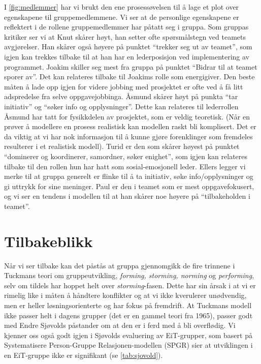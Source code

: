 I \cref{fig:medlemmer} har vi brukt den ene prosessøvelsen til å
lage et plot over egenskapene til gruppemedlemmene. Vi ser at de personlige
 egenskapene er reflektert i de rollene gruppemedlemmer har påtatt seg i gruppa. Som gruppas
kritiker ser vi at Knut skårer høyt, han setter ofte spørsmålstegn ved teamets avgjørelser. 
Han skårer også høyere på punktet ``trekker seg ut av teamet'', som igjen kan trekkes tilbake 
til at han har en lederposisjon ved implementering av
programmet. Joakim skiller seg mest fra gruppa på punktet ``Bidrar til at teamet 
sporer av''. Det kan relateres tilbake til Joakims rolle som energigiver. Den beste måten å lade opp igjen
for videre jobbing med prosjektet er ofte ved å få litt adspredelse fra selve oppgavejobbinga.
Åsmund skårer høyt på punkta ``tar initiativ'' og ``søker info og opplysninger''. 
Dette kan relateres til lederrollen Åsmund har tatt for fysikkdelen av prosjektet,
som er veldig teoretisk. (Når en prøver å modellere en prosess realistisk kan
modellen raskt bli komplisert. Det er da viktig at vi har nok informasjon til å
kunne gjøre forenklinger som fremdeles resulterer i et realistisk modell).
Turid er den som skårer høyest på punktet ``dominerer og koordinerer, samordner, søker
enighet'', som igjen kan relateres tilbake til den rollen hun har hatt som
sosial-emosjonell leder. Ellers legger vi merke til at gruppa
generelt er flinke til å ta initiativ, søke info/opplysninger og gi uttrykk for sine meninger. Paul
er den i teamet som er mest oppgavefokusert, og vi ser en tendens i modellen til
at han skårer noe høyere på ``tilbakeholden i teamet''.

\section{Tilbakeblikk}
\label{sec:tilbakeblikk}

Når vi ser tilbake kan det påstås at gruppa gjennomgikk de fire trinnene i
Tuckmans \cite{tuckman} teori om gruppeutvikling, \emph{forming, storming,
norming} og \emph{performing}, selv om tildels har hoppet helt over
\emph{storming}-fasen. Dette har sin årsak i at vi er rimelig like i måten å
håndtere konflikter og at vi ikke kverulerer unødvendig, men er heller
løsningsorienterte og har fokus på fremdrift. At Tuckmans modell ikke passer
helt i dagens grupper (det er en gammel teori fra 1965), passer godt med Endre
Sjøvolds \cite{sjovold} påstander om at den er i ferd med å bli overflødig. Vi
kjenner oss også godt igjen i Sjøvolds evaluering av EiT-grupper, som basert på
Systematisere Person-Gruppe Relasjonen-modellen (SPGR) sier at utviklingen i en
EiT-gruppe ikke er signifikant (se \cref{tab:sjovold}).

